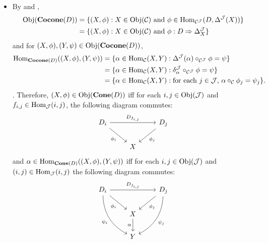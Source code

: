 \documentclass{book}
\begin{document}
\begin{note}
\begin{itemize}
\[			\]
			\item By  and ,
			\begin{align*}
				\operatorname{Obj}(\operatorname*{\text{\textbf{Cocone}}}(D)) 
				& = \{(X, \phi): X \in \operatorname{Obj}(\mathcal{C}) \text{ and } \phi \in \operatorname{Hom}_{\mathcal{C}^{\mathcal{J}}}( D, \Delta^{\mathcal{J}}(X)) \} \\
				& = \{(X, \phi): X \in \operatorname{Obj}(\mathcal{C}) \text{ and } \phi: D \Rightarrow \Delta^{\mathcal{J}}_X\}
			\end{align*}
			and for $(X, \phi), (Y, \psi) \in \operatorname{Obj}(\operatorname*{\text{\textbf{Cocone}}}(D))$,
			\begin{align*}
				\operatorname{Hom}_{\operatorname*{\text{\textbf{Cocone}}}(D)}((X, \phi),(Y, \psi)) 
				& = \{\alpha \in \operatorname{Hom}_{\mathcal{C}}(X, Y): \Delta^{\mathcal{J}}(\alpha) \circ_{\mathcal{C}^{\mathcal{J}}} \phi = \psi \} \\
				& = \{\alpha \in \operatorname{Hom}_{\mathcal{C}}(X, Y): \delta^{\mathcal{J}}_{\alpha} \circ_{\mathcal{C}^{\mathcal{J}}} \phi = \psi \} \\
				& = \{\alpha \in \operatorname{Hom}_{\mathcal{C}}(X, Y): \text{for each $j \in \mathcal{J}$, $\alpha \circ_{\mathcal{C}} \phi_j = \psi_j$} \}.
			\end{align*}
			. Therefore, $(X, \phi) \in \operatorname{Obj}(\operatorname*{\text{\textbf{Cone}}}(D))$ iff for each $i,j \in \operatorname{Obj}(\mathcal{J})$ and $f_{i,j} \in \operatorname{Hom}_{\mathcal{J}}(i, j)$, the following diagram commutes:
			\[ 
			\begin{tikzcd}
				D_i \arrow[dr, "\phi_i"'] \arrow[rr, "D_{f_{i,j}}"] &&  D_j \arrow[dl, "\phi_j"]  \\ 
				&  X  & 
			\end{tikzcd}
			\]  
			and $\alpha \in \operatorname{Hom}_{\operatorname*{\text{\textbf{Cone}}}(D)}((X, \phi), (Y, \psi))$ iff  for each $i,j \in \operatorname{Obj}(\mathcal{J})$ and $(i,j) \in \operatorname{Hom}_{\mathcal{J}}(i, j)$ the following diagram commutes: 
			\[ 
			\begin{tikzcd}
				D_i \arrow[dr, "\phi_i"'] \arrow[rr, "D_{f_{i,j}}"] \arrow[bend right=30, swap]{ddr}{\psi_i}  & &  D_j \arrow[dl, "\phi_j"] \arrow[bend left=30]{ddl}{\psi_j} \\ 
				&  X  \arrow[d, "\al"'] & \\
				&  Y & 
			\end{tikzcd}
			\]
			
		\end{itemize}
	\end{note}
	
\end{document}
